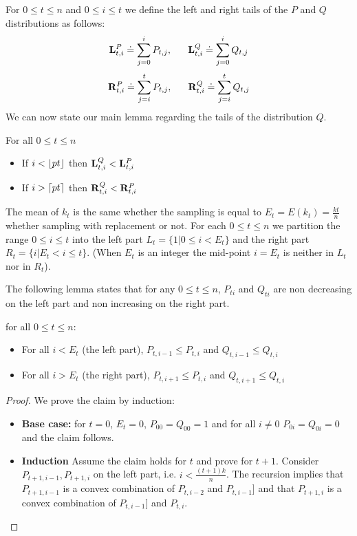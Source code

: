 For $0 \leq t \leq n$ and $0 \leq i \leq t$ we define the left and
right tails of the $P$ and $Q$ distributions as follows:
\[
{\mathbf L}^{P}_{t,i} \doteq \sum_{j=0}^i P_{t,j},\;\;\;\;\;\;
{\mathbf L}^{Q}_{t,i} \doteq \sum_{j=0}^i Q_{t,j}
\]
\[
{\mathbf R}^{P}_{t,i} \doteq \sum_{j=i}^t P_{t,j},\;\;\;\;\;\;
{\mathbf R}^{Q}_{t,i} \doteq \sum_{j=i}^t Q_{t,j}
\]
We can now state our main lemma regarding the tails of the
distribution $Q$.
\begin{lemma}
  For all $0\leq t \leq n$
  \begin{itemize}
    \item If $i < \lfloor p t \rfloor$ then ${\mathbf L}^{Q}_{t,i} < {\mathbf L}^{P}_{t,i}$
    \item If $i > \lceil p t \rceil$ then ${\mathbf R}^{Q}_{t,i} < {\mathbf R}^{P}_{t,i}$
    \end{itemize}
\end{lemma}

\iffalse
The mean of $k_t$ is the same whether the sampling is equal to
$E_t=E(k_t)=\frac{kt}{n}$ whether sampling with replacement or
not. For each $0\leq t \leq n$ we partition the range $0\leq i \leq t$
into the left part $L_t = \{1 | 0 \leq i <E_t \}$
and the right part $R_t=\{i | E_t < i \leq t\}$. (When
$E_t$ is an integer the mid-point $i=E_t$ is neither in $L_t$ nor in $R_t$).

The following lemma states that for any $0 \leq t \leq n$,
$P_{ti}$ and $Q_{ti}$ are non decreasing on the left part and non
increasing on the right part.
\begin{lemma}
  for all $0 \leq t \leq n$:
  \begin{itemize}
  \item For all $i< E_t$ (the left part), $P_{t,i-1} \leq P_{t,i}$ and
    $Q_{t,i-1} \leq Q_{t,i}$
  \item For all $i>E_t$ (the right part), $P_{t,i+1} \leq P_{t,i}$ and
    $Q_{t,i+1} \leq Q_{t,i}$
  \end{itemize}
\end{lemma}
\begin{proof}
  We prove the claim by induction:
  \begin{itemize}
    \item {\bf Base case:} for $t=0$, $E_t=0$, $P_{00}=Q_{00}=1$ and
      for all $i\neq 0$ $P_{0i}=Q_{0i}=0$ and the claim follows.
    \item {\bf Induction} Assume the claim holds for $t$ and prove for
      $t+1$. Consider $P_{t+1,i-1},P_{t+1,i}$ on the left
      part, i.e. $i < \frac{(t+1)k}{n}$. The recursion
      implies that $P_{t+1,i-1}$ is a convex combination of 
      $P_{t,i-2}$ and $P_{t,i-1}]$ and that $P_{t+1,i}$ is a convex
        combination of $P_{t,i-1}]$ and $P_{t,i}$. 
    \end{itemize}
\end{proof}


